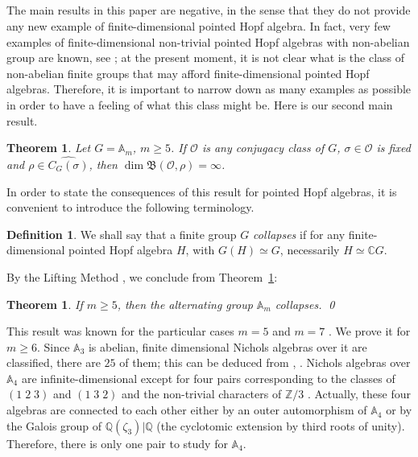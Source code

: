\documentclass[11pt]{amsart} \textheight 22cm
\renewcommand{\^}[1]{\mbox{$^{\left( #1 \right)}$}}
\renewcommand{\_}[1]{\mbox{$_{\left( #1 \right)}$}}
\newcommand\toba{{\mathfrak B }}
\newcommand{\ku}{\mathbb C}
\newcommand{\Z}{{\mathbb Z}}
\newcommand{\Oc}{{\mathcal O}}
\theoremstyle{plain}
\newtheorem{theorem}[lema]{Theorem}
\theoremstyle{definition}
\newtheorem{definition}[lema]{Definition}
\theoremstyle{remark}
\newcommand\am{\mathbb A_m}
\newcommand\A{\mathbb A}
\theoremstyle{remark}
\begin{document}
\medbreak\subsection{} The main results in this paper are
negative, in the sense that they do not provide any new example of
finite-dimensional pointed Hopf algebra. In fact, very few
examples of finite-dimensional non-trivial pointed Hopf algebras with non-abelian group are known,
see \cite{G2}; at the present moment, it is not clear what is the
class of non-abelian finite groups that may afford
finite-dimensional pointed Hopf algebras. Therefore, it is
important to narrow down as many examples as possible in order to
have a feeling of what this class might be. Here is our second
main result.

\begin{theorem}\label{th:an}
    Let $G = \am$, $m\ge 5$. If $\Oc$ is any conjugacy class of $G$, $\sigma\in \Oc$ is
    fixed and $\rho\in \widehat{C_{G}(\sigma)}$, then $\dim \toba(\Oc, \rho) = \infty$.
\end{theorem}

In order to state the consequences of this result for pointed Hopf
algebras, it is convenient to introduce the following terminology.
\begin{definition}\label{def-intro:gpo-collapses}
    We shall say that a finite group $G$ \emph{collapses} if for any finite-dimensional
    pointed Hopf algebra $H$, with $G(H) \simeq G$, necessarily $H\simeq\ku G$.
\end{definition}

By the Lifting Method \cite{AS-cambr}, we conclude from
Theorem~\ref{th:an}:
\begin{theorem}\label{th:an-pointed}
    If $m\ge 5$, then the alternating group $\am$ collapses. \qed
\end{theorem}

This result was known for the particular cases $m=5$ and $m=7$
\cite{AF2,F-tesis}. We prove it for $m\ge 6$. Since $\A_3$ is
abelian, finite dimensional Nichols algebras over it are
classified, there are $25$ of them; this can be deduced from
\cite[Th. 1.3]{AS-adv}, \cite[Th. 1.8]{AS2}. Nichols algebras over
$\A_4$ are infinite-dimensional except for four pairs
corresponding to the classes of $(1\;2\;3)$ and $(1\;3\;2)$ and
the non-trivial characters of $\Z/3$ \cite[\S 2.2]{AF2}. Actually,
these four algebras are connected to each other either by an outer
automorphism of $\A_4$ or by the Galois group of $\mathbb
Q(\zeta_3)|\mathbb Q$ (the cyclotomic extension by third roots of
unity). Therefore, there is only one pair to study for $\A_4$.
\end{document}
